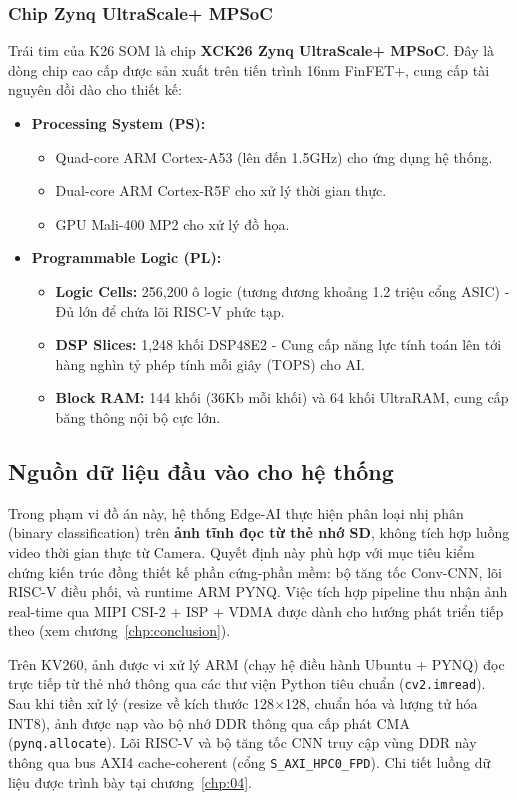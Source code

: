 \subsubsection{Chip Zynq UltraScale+ MPSoC}
Trái tim của K26 SOM là chip \textbf{XCK26 Zynq UltraScale+ MPSoC}. Đây là dòng chip cao cấp được sản xuất trên tiến trình 16nm FinFET+, cung cấp tài nguyên dồi dào cho thiết kế:
\begin{itemize}
    \item \textbf{Processing System (PS):}
        \begin{itemize}
            \item Quad-core ARM Cortex-A53 (lên đến 1.5GHz) cho ứng dụng hệ thống.
            \item Dual-core ARM Cortex-R5F cho xử lý thời gian thực.
            \item GPU Mali-400 MP2 cho xử lý đồ họa.
        \end{itemize}
    \item \textbf{Programmable Logic (PL):}
        \begin{itemize}
            \item \textbf{Logic Cells:} 256,200 ô logic (tương đương khoảng 1.2 triệu cổng ASIC) - Đủ lớn để chứa lõi RISC-V phức tạp.
            \item \textbf{DSP Slices:} 1,248 khối DSP48E2 - Cung cấp năng lực tính toán lên tới hàng nghìn tỷ phép tính mỗi giây (TOPS) cho AI.
            \item \textbf{Block RAM:} 144 khối (36Kb mỗi khối) và 64 khối UltraRAM, cung cấp băng thông nội bộ cực lớn.
        \end{itemize}
\end{itemize}

\subsection{Nguồn dữ liệu đầu vào cho hệ thống}
Trong phạm vi đồ án này, hệ thống Edge-AI thực hiện phân loại nhị phân (binary classification) trên \textbf{ảnh tĩnh đọc từ thẻ nhớ SD}, không tích hợp luồng video thời gian thực từ Camera. Quyết định này phù hợp với mục tiêu kiểm chứng kiến trúc đồng thiết kế phần cứng-phần mềm: bộ tăng tốc Conv-CNN, lõi RISC-V điều phối, và runtime ARM PYNQ. Việc tích hợp pipeline thu nhận ảnh real-time qua MIPI CSI-2 + ISP + VDMA được dành cho hướng phát triển tiếp theo (xem chương~\ref{chp:conclusion}).

Trên KV260, ảnh được vi xử lý ARM (chạy hệ điều hành Ubuntu + PYNQ) đọc trực tiếp từ thẻ nhớ thông qua các thư viện Python tiêu chuẩn (\texttt{cv2.imread}). Sau khi tiền xử lý (resize về kích thước 128$\times$128, chuẩn hóa và lượng tử hóa INT8), ảnh được nạp vào bộ nhớ DDR thông qua cấp phát CMA (\texttt{pynq.allocate}). Lõi RISC-V và bộ tăng tốc CNN truy cập vùng DDR này thông qua bus AXI4 cache-coherent (cổng \texttt{S\_AXI\_HPC0\_FPD}). Chi tiết luồng dữ liệu được trình bày tại chương~\ref{chp:04}.
%
